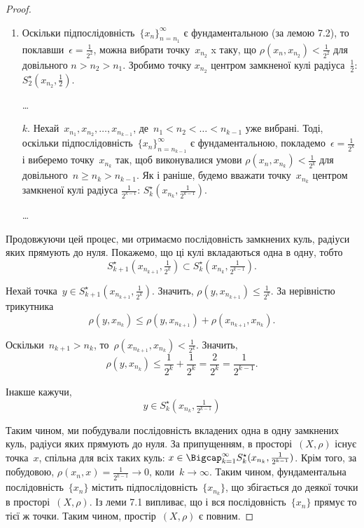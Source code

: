 \begin{proof}
\begin{enumerate}
\item Оскільки підпослідовність~$\{x_n\}_{n = n_1}^\infty$
є фундаментальною (за лемою 7.2), то поклавши~$\epsilon = \frac{1}{2^2}$,
можна вибрати точку~$x_{n_2}$ x таку, що 
$\rho(x_n, x_{n_2}) < \frac{1}{2^2}$ для довільного
$n > n_2 > n_1$. Зробимо точку
$x_{n_2}$ центром замкненої кулі
радіуса~$\frac{1}{2}$: $S_2^\star(x_{n_2}, \frac{1}{2})$.

\dots

\item[$k$.] Нехай~$x_{n_1}, x_{n_2}, \dots, x_{n_{k - 1}}$,
де~$n_1 < n_2 < \dots < n_{k - 1}$ уже вибрані.
Тоді, оскільки підпослідовність~$\{x_n\}_{n = n_{k - 1}}^\infty$
є фундаментальною, покладемо~$\epsilon = \frac{1}{2^k}$ і виберемо
точку~$x_{n_k}$ так, щоб виконувалися умови 
$\rho(x_n, x_{n_k}) < \frac{1}{2^k}$
для довільного~$n \ge n_k > n_{k - 1}$. Як і раніше, будемо
вважати точку~$x_{n_k}$ центром замкненої кулі радіуса
$\frac{1}{2^{k - 1}}$: $S_k^\star(x_{n_k}, \frac{1}{2^{k - 1}})$.

\dots
\end{enumerate}

Продовжуючи цей процес, ми отримаємо послідовність
замкнених куль, радіуси яких прямують до нуля. Покажемо,
що ці кулі вкладаються одна в одну, тобто
\begin{equation*}
    S_{k + 1}^\star ( x_{n_{k + 1}}, \tfrac{1}{2^k} ) \subset
    S_k^\star ( x_{n_k}, \tfrac{1}{2^{k - 1}} ).
\end{equation*}

Нехай точка~$y \in S_{k + 1}^\star ( x_{n_{k + 1}}, \tfrac{1}{2^k} )$.
Значить, $\rho(y, x_{n_{k + 1}}) \le \frac{1}{2^k}$.
За нерівністю трикутника
\begin{equation*}
    \rho(y, x_{n_k}) \le \rho(y, x_{n_{k + 1}}) + \rho(x_{n_{k + 1}}, x_{n_k}).
\end{equation*}

Оскільки~$n_{k + 1} > n_k$, то~$\rho(x_{n_{k + 1}}, x_{n_k}) < \frac{1}{2^k}$. Значить,
\begin{equation*}
    \rho(y, x_{n_k}) \le \frac{1}{2^k} + \frac{1}{2^k} =
    \frac{2}{2^k} = \frac{1}{2^{k - 1}}.
\end{equation*}

Інакше кажучи,
\begin{equation*}
    y \in S_k^\star ( x_{n_k}, \tfrac{1}{2^{k - 1}} )
\end{equation*}

Таким чином, ми побудували послідовність вкладених одна
в одну замкнених куль, радіуси яких прямують до нуля.
За припущенням, в просторі~$(X, \rho)$ існує точка~$x$,
спільна для всіх таких куль:
$x \in \Bigcap_{k = 1}^\infty S_k^\star(x_{n_k}, \frac{1}{2^{k - 1}})$. 
Крім того, за побудовою, $\rho(x_n, x) = \frac{1}{2^{k - 1}} \to 0$,
коли~$k \to \infty$. Таким чином,
фундаментальна послідовність~$\{x_n\}$ містить
підпослідовність~$\{x_{n_k}\}$, що збігається до деякої точки в
просторі~$(X, \rho)$. Із леми 7.1 випливає, що і вся
послідовність~$\{x_n\}$ прямує то тієї ж точки. Таким чином,
простір~$(X, \rho)$ є повним.
\end{proof}

